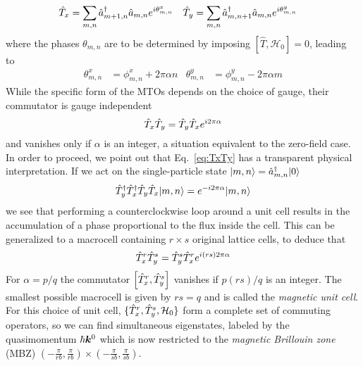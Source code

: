 %
\begin{align}
  \hat{T}_{x} &= \sum_{m,n} \hat{a}^{\dagger}_{m+1,n}\hat{a}_{m,n}e^{i\theta^x_{m,n}} &
  \hat{T}_{y} &= \sum_{m,n} \hat{a}^{\dagger}_{m,n+1}\hat{a}_{m,n}e^{i\theta^y_{m,n}}
\end{align}
%
where the phases $\theta_{m,n}$ are to be determined by imposing
$\left[\hat{T}, \mathcal{H}_0 \right] = 0$, leading
to~\cite{bernevig2013topological}
%
\begin{align}
  \theta^x_{m,n} &= \phi^x_{m,n} + 2\pi\alpha n &
  \theta^y_{m,n} &= \phi^y_{m,n} - 2\pi\alpha m 
\end{align}
% 
While the specific form of the MTOs depends on the choice of gauge,
their commutator is gauge independent
%
\begin{equation}\label{eq:TxTy}
  \hat{T}_{x} \hat{T}_{y} = \hat{T}_{y} \hat{T}_{x}  e^{i2\pi\alpha} 
\end{equation}
% 
and vanishes only if $\alpha$ is an integer, a situation equivalent to
the zero-field case. In order to proceed, we point out that
Eq.~\eqref{eq:TxTy} has a transparent physical interpretation. If we
act on the single-particle state
$\vert m,n \rangle = \hat{a}^{\dagger}_{m,n}\vert 0 \rangle$
%
\begin{equation}\label{eq:translation-loop}
  \hat{T}_{y}^{\dagger} \hat{T}_{x}^{\dagger} \hat{T}_{y} \hat{T}_{x} \vert m,n \rangle = e^{-i2\pi\alpha} \vert m,n \rangle
\end{equation}
%
we see that performing a counterclockwise loop around a unit cell
results in the accumulation of a phase proportional to the flux inside
the cell. This can be generalized to a macrocell containing
$r \times s$ original lattice cells, to deduce that
%
\begin{equation}
  \hat{T}_{x}^r\hat{T}_{y}^s = \hat{T}_{y}^s\hat{T}_{x}^re^{i(rs)2\pi\alpha}
\end{equation}
% 
For $\alpha = p/q$ the commutator $\left[\hat{T}_{x}^r, \hat{T}_{y}^s\right]$ vanishes
if $p (rs)/q$ is an integer. The smallest possible macrocell is given
by $rs = q$ and is called the \textit{magnetic unit cell}. For this
choice of unit cell, $\{\hat{T}_{x}^r, \hat{T}_{y}^s, \mathcal{H}_0\}$ form a complete
set of commuting operators, so we can find simultaneous eigenstates,
labeled by the quasimomentum $\hbar\bm{k}^0$ which is now restricted to
the \textit{magnetic Brillouin zone} (MBZ)
$\left(-\frac{\pi}{rb}, \frac{\pi}{rb}\right) \times
\left(-\frac{\pi}{sb}, \frac{\pi}{sb}\right)$.


